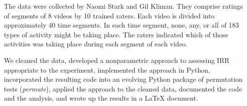 \documentclass[]{article}
\begin{document}
The data were collected by Naomi Stark and Gil Kliman. They
comprise ratings of segments of 8 videos by 10 trained raters. Each
video is divided into approximately 40 time segments. In each time
segment, none, any, or all of 183 types of activity might be taking
place. The raters indicated which of those activities was taking place
during each segment of each video.

We cleaned the data, developed a nonparametric approach to assessing IRR
appropriate to the experiment, implemented the approach in Python,
incorporated the resulting code into an evolving Python package of
permutation tests (\emph{permute}), applied the approach to the cleaned
data, documented the code and the analysis, and wrote up the results in
a LaTeX document. 

\cite{millman2014developing}
\end{document}
